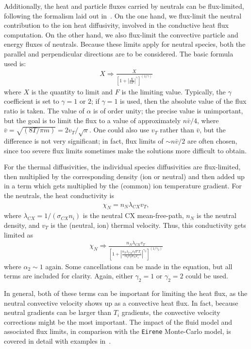 \documentclass[a4paper,10pt]{report}
\begin{document}
Additionally, the heat and particle fluxes carried by neutrals can be flux-limited, following the formalism
laid out in~\cite{UMANSKY03A}. On the one hand, we flux-limit the neutral contribution
to the ion heat diffusivity, involved
in the conductive heat flux computation. On the other hand, we also flux-limit the convective
particle and energy fluxes of neutrals. Because these limits apply for neutral species, both the parallel
and perpendicular directions are to be considered.
The basic formula used is:
\begin{gather}
X \Rightarrow  \frac{X}{\left[ 1 + \left|\frac{X}{\alpha F}\right|^\gamma\right]^{(1/\gamma)}}
\end{gather}
where
$X$ is the quantity to limit and $F$ is the limiting value.
Typically, the $\gamma$ coefficient is set to $\gamma=1$
or $2$; if $\gamma=1$ is used, then the absolute value of the flux
ratio is taken.  The value of $\alpha$ is of order unity; the
precise value is unimportant, but the goal is to limit the flux to a value of
approximately $n {\bar v}/4$, where ${\bar v} = \sqrt{(8T/\pi m)} = 2 v_T /\sqrt{\pi}$.
One could also use $v_T$ rather than ${\bar v}$, but the
difference is not very significant; in fact, flux
limits of $\sim n {\bar v}/2$ are often chosen, since too severe flux limits sometimes make the
solutions more difficult to obtain.

For the thermal diffusivities, the individual species
diffusivities are flux-limited, then multiplied by the corresponding density (ion or neutral) and
then added up in a term which gets multiplied by the (common) ion
temperature gradient. For the neutrals, the heat conductivity is
\begin{gather}
\chi_N  = n_N \lambda_{CX} v_T ,
\end{gather}
where $\lambda_{CX} = 1/(\sigma_{CX} n_i)$ is the neutral CX mean-free-path,
$n_N$ is the neutral density, and $v_T$ is the (neutral, ion) thermal
velocity.  Thus, this conductivity gets limited as
\begin{gather}
\chi_N \Rightarrow \frac{n_N \lambda_{CX} v_T}{{\left[1 + {\left|\frac{n_N \lambda_{CX} v_T \nabla T_i}
{\alpha_2 v_T n_N T_i}\right|}^{\gamma_2} \right]}^{(1/\gamma_2)}}
\end{gather}
where $\alpha_2 \sim 1$ again.  Some cancellations can be made in the equation,
but all terms are included for clarity.  Again, either $\gamma_2=1$ or $\gamma_2=2$ could be used.

In general, both of these terms can be important for
limiting the heat flux, as the neutral convective velocity shows up as a
convective heat flux.  In fact, because neutral gradients can be larger
than $T_i$ gradients, the convective velocity corrections might be the most
important.
The impact of the fluid model and associated flux limits, in comparison with
the {\tt Eirene} Monte-Carlo model, is covered in detail with examples in~\cite{CosterHinM2003}.
\end{document}
